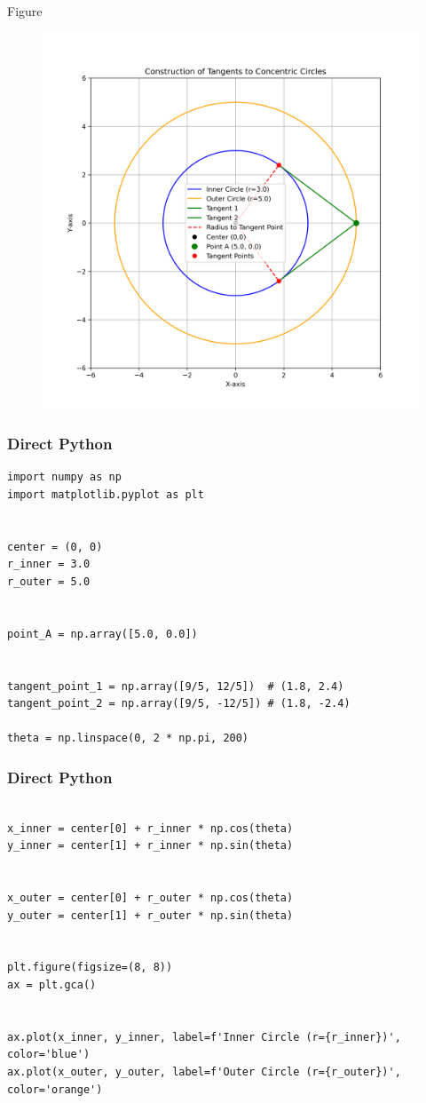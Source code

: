 \documentclass{beamer}
\begin{document}
\begin{frame}{Figure}
    \begin{figure}[H]
        \centering
        \includegraphics[width=0.7\columnwidth]{figs/figure.png}
        \caption{}
        \label{fig:placeholder}
    \end{figure}
\end{frame}
\begin{frame}[fragile]
\frametitle{Direct Python}
\begin{lstlisting}
import numpy as np
import matplotlib.pyplot as plt


center = (0, 0)
r_inner = 3.0
r_outer = 5.0


point_A = np.array([5.0, 0.0])


tangent_point_1 = np.array([9/5, 12/5])  # (1.8, 2.4)
tangent_point_2 = np.array([9/5, -12/5]) # (1.8, -2.4)

theta = np.linspace(0, 2 * np.pi, 200)
\end{lstlisting}
\end{frame}
\begin{frame}[fragile]
\frametitle{Direct Python}
\begin{lstlisting}

x_inner = center[0] + r_inner * np.cos(theta)
y_inner = center[1] + r_inner * np.sin(theta)


x_outer = center[0] + r_outer * np.cos(theta)
y_outer = center[1] + r_outer * np.sin(theta)


plt.figure(figsize=(8, 8))
ax = plt.gca()


ax.plot(x_inner, y_inner, label=f'Inner Circle (r={r_inner})', color='blue')
ax.plot(x_outer, y_outer, label=f'Outer Circle (r={r_outer})', color='orange')
\end{lstlisting}
\end{frame}
\end{document}
